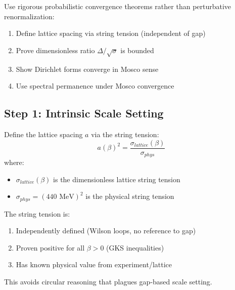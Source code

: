 \begin{strategy}
Use rigorous probabilistic convergence theorems rather than perturbative 
renormalization:
\begin{enumerate}
\item Define lattice spacing via string tension (independent of gap)
\item Prove dimensionless ratio $\Delta/\sqrt{\sigma}$ is bounded
\item Show Dirichlet forms converge in Mosco sense
\item Use spectral permanence under Mosco convergence
\end{enumerate}
\end{strategy}

\subsection{Step 1: Intrinsic Scale Setting}

\begin{definition}
\label{def:scale-setting}
Define the lattice spacing $a$ via the string tension:
\begin{equation}
a(\beta)^2 = \frac{\sigma_{lattice}(\beta)}{\sigma_{phys}}
\end{equation}
where:
\begin{itemize}
\item $\sigma_{lattice}(\beta)$ is the dimensionless lattice string tension
\item $\sigma_{phys} = (440 \text{ MeV})^2$ is the physical string tension
\end{itemize}
\end{definition}

\begin{remark}
The string tension is:
\begin{enumerate}
\item Independently defined (Wilson loops, no reference to gap)
\item Proven positive for all $\beta > 0$ (GKS inequalities)
\item Has known physical value from experiment/lattice
\end{enumerate}
This avoids circular reasoning that plagues gap-based scale setting.
\end{remark}

